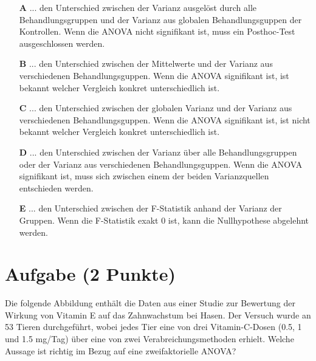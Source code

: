 \documentclass[a4paper, 9pt]{scrartcl}\usepackage[]{graphicx}\usepackage[]{xcolor}
\begin{document}
\begin{enumerate}
\item [\textbf{A} \msquare] ... den Unterschied zwischen der Varianz ausgelöst durch alle Behandlungsgruppen und der Varianz aus globalen Behandlungsguppen der Kontrollen. Wenn die ANOVA nicht signifikant ist, muss ein Posthoc-Test ausgeschlossen werden.
\item [\textbf{B} \msquare] ... den Unterschied zwischen der Mittelwerte und der Varianz aus verschiedenen Behandlungsguppen. Wenn die ANOVA signifikant ist, ist bekannt welcher Vergleich konkret unterschiedlich ist.
\item [\textbf{C} \msquare] ... den Unterschied zwischen der globalen Varianz und der Varianz aus verschiedenen Behandlungsguppen. Wenn die ANOVA signifikant ist, ist nicht bekannt welcher Vergleich konkret unterschiedlich ist.
\item [\textbf{D} \msquare] ... den Unterschied zwischen der Varianz über alle Behandlungsgruppen oder der Varianz aus verschiedenen Behandlungsguppen. Wenn die ANOVA signifikant ist, muss sich zwischen einem der beiden Varianzquellen entschieden werden.
\item [\textbf{E} \msquare] ... den Unterschied zwischen der F-Statistik anhand der Varianz der Gruppen. Wenn die F-Statistik exakt 0 ist, kann die Nullhypothese abgelehnt werden.
\end{enumerate} 

\section{Aufgabe \hfill (2 Punkte)}



Die folgende Abbildung enthält die Daten aus einer Studie zur Bewertung der Wirkung von Vitamin E auf das Zahnwachstum bei Hasen. Der Versuch wurde an 53 Tieren durchgeführt, wobei jedes Tier eine von  drei Vitamin-C-Dosen (0.5, 1 und 1.5 mg/Tag) über eine von zwei Verabreichungsmethoden erhielt. Welche Aussage ist richtig im Bezug auf eine zweifaktorielle ANOVA?
\end{document}
